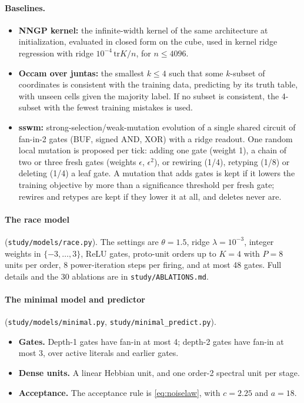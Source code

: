 \paragraph{Baselines.}
\begin{itemize}
\item \textbf{NNGP kernel:} the infinite-width kernel of the same architecture at initialization, evaluated in closed form on the cube, used in kernel ridge regression with ridge $10^{-4}\,\mathrm{tr}K/n$, for $n\le4096$.
\item \textbf{Occam over juntas:} the smallest $k\le4$ such that some $k$-subset of coordinates is consistent with the training data, predicting by its truth table, with unseen cells given the majority label. If no subset is consistent, the 4-subset with the fewest training mistakes is used.
\item \textbf{sswm:} strong-selection/weak-mutation evolution of a single shared circuit of fan-in-2 gates (BUF, signed AND, XOR) with a ridge readout. One random local mutation is proposed per tick: adding one gate (weight 1), a chain of two or three fresh gates (weights $\epsilon$, $\epsilon^2$), or rewiring (1/4), retyping (1/8) or deleting (1/4) a leaf gate. A mutation that adds gates is kept if it lowers the training objective by more than a significance threshold per fresh gate; rewires and retypes are kept if they lower it at all, and deletes never are.
\end{itemize}

\paragraph{The race model} (\texttt{study/models/race.py}). The settings are $\theta=1.5$, ridge $\lambda=10^{-3}$, integer weights in $\{-3,\dots,3\}$, ReLU gates, proto-unit orders up to $K=4$ with $P=8$ units per order, 8 power-iteration steps per firing, and at most 48 gates. Full details and the 30 ablations are in \texttt{study/ABLATIONS.md}.

\paragraph{The minimal model and predictor} (\texttt{study/models/minimal.py}, \texttt{study/minimal\_predict.py}).
\begin{itemize}
\item \textbf{Gates.} Depth-1 gates have fan-in at most 4; depth-2 gates have fan-in at most 3, over active literals and earlier gates.
\item \textbf{Dense units.} A linear Hebbian unit, and one order-2 spectral unit per stage.
\item \textbf{Acceptance.} The acceptance rule is \eqref{eq:noiselaw}, with $c=2.25$ and $a=18$.
\end{itemize}

